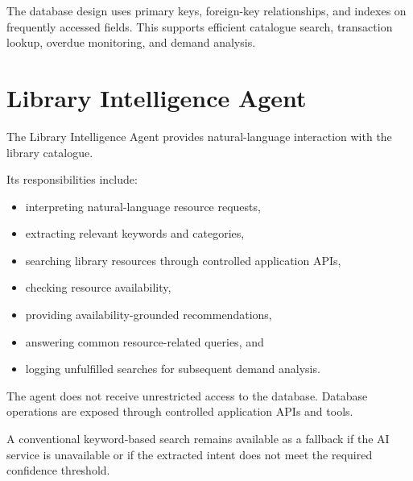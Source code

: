 \documentclass{tietreport}
\begin{document}
The database design uses primary keys, foreign-key relationships, and
indexes on frequently accessed fields. This supports efficient catalogue
search, transaction lookup, overdue monitoring, and demand analysis.


\section{Library Intelligence Agent}

The Library Intelligence Agent provides natural-language interaction with
the library catalogue.

Its responsibilities include:

\begin{itemize}

    \item interpreting natural-language resource requests,

    \item extracting relevant keywords and categories,

    \item searching library resources through controlled application APIs,

    \item checking resource availability,

    \item providing availability-grounded recommendations,

    \item answering common resource-related queries, and

    \item logging unfulfilled searches for subsequent demand analysis.

\end{itemize}

The agent does not receive unrestricted access to the database. Database
operations are exposed through controlled application APIs and tools.

A conventional keyword-based search remains available as a fallback if the
AI service is unavailable or if the extracted intent does not meet the
required confidence threshold.

\end{document}
